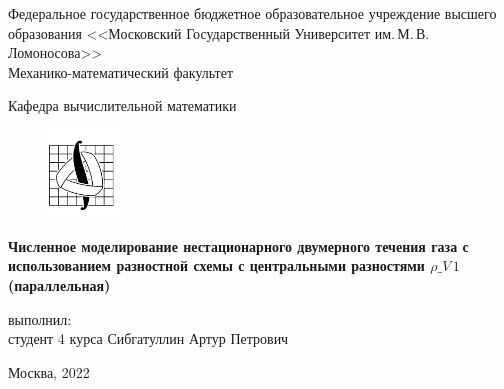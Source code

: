 \begin{titlepage}
	\begin{center}
		
		Федеральное государственное бюджетное образовательное учреждение высшего образования 
		<<Московский Государственный Университет им.\,М.\,В.\,Ломоносова>>\\
		
		Механико-математический факультет
		
		Кафедра вычислительной математики\\[0.6cm]
		
		\begin{figure}[!htp]
			\begin{center}
				{\includegraphics[width=20mm]{pics/mmlogo.png}}
			\end{center}
		\end{figure}
		
		\vspace{3cm}
		
		{\bf Численное моделирование нестационарного двумерного течения газа с использованием разностной схемы с центральными разностями $\rho\_V\,  1$ (параллельная)}
		
		\vspace{5cm}
		\begin{flushright}
			{ выполнил:}\\
			студент 4 курса Сибгатуллин Артур Петрович\\[0.5cm]
		\end{flushright}
		\vspace{1cm}
		
		\normalsize Москва, 2022
	\end{center}
\end{titlepage}
